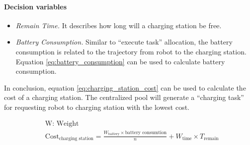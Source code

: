 \paragraph*{Decision variables}

\begin{itemize}
	\item \textsl{Remain Time.} It describes how long will a charging station be free. 
	\item \textsl{Battery Consumption.} Similar to ``execute task'' allocation, the battery consumption is related to the trajectory from robot to the charging station. Equation \ref{eq:battery_consumption} can be used to calculate battery consumption.
\end{itemize}
In conclusion, equation \ref{eq:charging_station_cost} can be used to calculate the cost of a charging station. The centralized pool will generate a ``charging task'' for requesting robot to charging station with the lowest cost.

\begin{equation}	
\label{eq:charging_station_cost}
\begin{aligned}
	& \mbox{W: Weight } \\
	& \mbox{Cost}_{\mbox{charging station}} = \frac{W_{\mbox{battery}} \times \mbox{battery consumtion}}{n} + W_{\mbox{time}} \times T_{\mbox{remain}}
\end{aligned}
\end{equation}

